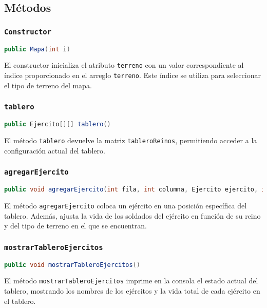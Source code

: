 \subsection{Métodos}

\subsubsection{\texttt{Constructor}}
\begin{lstlisting}[language=Java]
public Mapa(int i)
\end{lstlisting}
El constructor inicializa el atributo \texttt{terreno} con un valor correspondiente al índice proporcionado en el arreglo \texttt{terreno}. Este índice se utiliza para seleccionar el tipo de terreno del mapa.

\subsubsection{\texttt{tablero}}
\begin{lstlisting}[language=Java]
public Ejercito[][] tablero()
\end{lstlisting}
El método \texttt{tablero} devuelve la matriz \texttt{tableroReinos}, permitiendo acceder a la configuración actual del tablero.

\subsubsection{\texttt{agregarEjercito}}
\begin{lstlisting}[language=Java]
public void agregarEjercito(int fila, int columna, Ejercito ejercito, int totalSoldados)
\end{lstlisting}
El método \texttt{agregarEjercito} coloca un ejército en una posición específica del tablero. Además, ajusta la vida de los soldados del ejército en función de su reino y del tipo de terreno en el que se encuentran.

\subsubsection{\texttt{mostrarTableroEjercitos}}
\begin{lstlisting}[language=Java]
public void mostrarTableroEjercitos()
\end{lstlisting}
El método \texttt{mostrarTableroEjercitos} imprime en la consola el estado actual del tablero, mostrando los nombres de los ejércitos y la vida total de cada ejército en el tablero.

